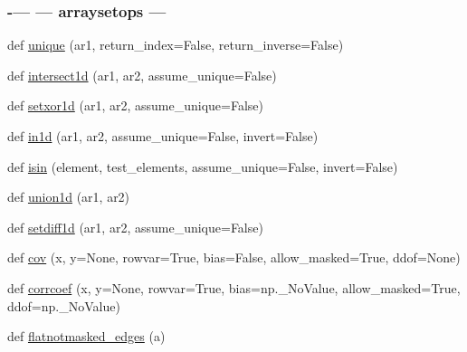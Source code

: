 \begin{DoxyCompactItemize}
\begin{DoxyCompactList}
 \subsubsection*{-\/--- --- arraysetops --- }\end{DoxyCompactList}\item 
def \hyperlink{namespacenumpy_1_1ma_1_1extras_a79ba274ef219d38625f48f5fc490ec7c}{unique} (ar1, return\+\_\+index=False, return\+\_\+inverse=False)
\item 
def \hyperlink{namespacenumpy_1_1ma_1_1extras_a75189ea3a02fefb33f9847d5540fdfd1}{intersect1d} (ar1, ar2, assume\+\_\+unique=False)
\item 
def \hyperlink{namespacenumpy_1_1ma_1_1extras_a8975f3af9dda34908dfa233fbca3c0fe}{setxor1d} (ar1, ar2, assume\+\_\+unique=False)
\item 
def \hyperlink{namespacenumpy_1_1ma_1_1extras_a81b38072890e630215b0a6d6b6a8409c}{in1d} (ar1, ar2, assume\+\_\+unique=False, invert=False)
\item 
def \hyperlink{namespacenumpy_1_1ma_1_1extras_a690428ae753e44d10b4b2b58ee4bb19f}{isin} (element, test\+\_\+elements, assume\+\_\+unique=False, invert=False)
\item 
def \hyperlink{namespacenumpy_1_1ma_1_1extras_a70dfeb45369189c266e0af67cf768f15}{union1d} (ar1, ar2)
\item 
def \hyperlink{namespacenumpy_1_1ma_1_1extras_a7f81c7f639f6f7b8c1ce7ad0514f2a29}{setdiff1d} (ar1, ar2, assume\+\_\+unique=False)
\item 
def \hyperlink{namespacenumpy_1_1ma_1_1extras_a621878d481405c2ed2c0d47fce7e576d}{cov} (x, y=None, rowvar=True, bias=False, allow\+\_\+masked=True, ddof=None)
\item 
def \hyperlink{namespacenumpy_1_1ma_1_1extras_ad9d215f62082d634dbee7aecce6e265c}{corrcoef} (x, y=None, rowvar=True, bias=np.\+\_\+\+No\+Value, allow\+\_\+masked=True, ddof=np.\+\_\+\+No\+Value)
\item 
def \hyperlink{namespacenumpy_1_1ma_1_1extras_ae218290520443ec7ea1429993ad6ec4d}{flatnotmasked\+\_\+edges} (a)
\begin{DoxyCompactList}\small\item\em 


\end{DoxyCompactList}
\end{DoxyCompactItemize}
